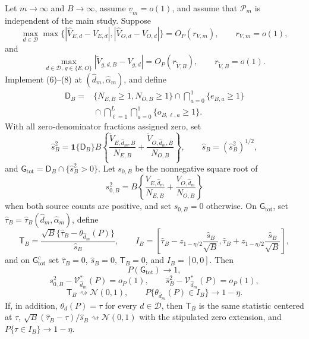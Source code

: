 Let \(m\to\infty\) and \(B\to\infty\), assume \(\underline v_m=o(1)\), and assume that \(\mathcal P_m\) is independent of the main study. Suppose
\[
 \max_{d\in\mathcal D}\max\{|\widehat V_{E,d}-V_{E,d}|,
 |\widehat V_{O,d}-V_{O,d}|\}=O_P(r_{V,m}),
 \qquad r_{V,m}=o(1), \tag{9}
\]
and
\[
 \max_{d\in\mathcal D,\,g\in\{E,O\}}
 |\widetilde V_{g,d,B}-V_{g,d}|=O_P(r_{\widetilde V,B}),
 \qquad r_{\widetilde V,B}=o(1). \tag{10}
\]
Implement (6)--(8) at \((\widehat d_m,\widehat\alpha_m)\), and define
\[
\begin{aligned}
 \mathsf D_B
 ={}&\{N_{E,B}\ge1,N_{O,B}\ge1\}
 \cap\bigcap_{a=0}^1\{e_{B,a}\ge1\}\\
 &{}\cap\bigcap_{\ell=1}^L\bigcap_{a=0}^1\{o_{B,\ell,a}\ge1\}.
\end{aligned} \tag{11}
\]
With all zero-denominator fractions assigned zero, set
\[
 \widehat s_B^2
 =\mathbf 1\{\mathsf D_B\}B\left\{
 \frac{\widetilde V_{E,\widehat d_m,B}}{N_{E,B}}
 +\frac{\widetilde V_{O,\widehat d_m,B}}{N_{O,B}}
 \right\},
 \qquad
 \widehat s_B=(\widehat s_B^2)^{1/2}, \tag{12}
\]
and \(\mathsf G_{\mathrm{tot}}=\mathsf D_B\cap\{\widehat s_B^2>0\}\). Let \(s_{0,B}\) be the nonnegative square root of
\[
 s_{0,B}^2
 =B\left\{\frac{V_{E,\widehat d_m}}{N_{E,B}}
 +\frac{V_{O,\widehat d_m}}{N_{O,B}}\right\} \tag{13}
\]
when both source counts are positive, and set \(s_{0,B}=0\) otherwise. On \(\mathsf G_{\mathrm{tot}}\), set \(\widehat\tau_B=\widehat\tau_B(\widehat d_m,\widehat\alpha_m)\), define
\[
 \mathsf T_B=\frac{\sqrt B\{\widehat\tau_B-\theta_{\widehat d_m}(P)\}}{\widehat s_B},
 \qquad
 I_B=\left[\widehat\tau_B-z_{1-\eta/2}\frac{\widehat s_B}{\sqrt B},
 \widehat\tau_B+z_{1-\eta/2}\frac{\widehat s_B}{\sqrt B}\right], \tag{14}
\]
and on \(\mathsf G_{\mathrm{tot}}^c\) set \(\widehat\tau_B=0\), \(\widehat s_B=0\), \(\mathsf T_B=0\), and \(I_B=[0,0]\). Then
\[
 P(\mathsf G_{\mathrm{tot}})\longrightarrow1, \tag{15}
\]
\[
 s_{0,B}^2-\mathcal V_{\widehat d_m}^*(P)=o_P(1),
 \qquad
 \widehat s_B^2-\mathcal V_{\widehat d_m}^*(P)=o_P(1), \tag{16}
\]
\[
 \mathsf T_B\rightsquigarrow\mathcal N(0,1),
 \qquad
 P\{\theta_{\widehat d_m}(P)\in I_B\}\longrightarrow1-\eta. \tag{17}
\]
If, in addition, \(\theta_d(P)=\tau\) for every \(d\in\mathcal D\), then \(\mathsf T_B\) is the same statistic centered at \(\tau\), \(\sqrt B(\widehat\tau_B-\tau)/\widehat s_B\rightsquigarrow\mathcal N(0,1)\) with the stipulated zero extension, and \(P\{\tau\in I_B\}\to1-\eta\).
